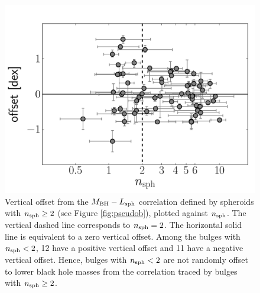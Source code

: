 \documentclass[preprint2]{emulateapj}
\begin{document}
\begin{figure}[h]
\begin{center}
\includegraphics[width=\columnwidth]{inset_psb.pdf}
\caption{Vertical offset from the $M_{\rm BH} - L_{\rm sph}$ correlation defined by spheroids with $n_{\rm sph} \geq 2$ (see Figure \ref{fig:pseudob}), 
plotted against $n_{\rm sph}$. 
The vertical dashed line corresponds to $n_{\rm sph} = 2$.
The horizontal solid line is equivalent to a zero vertical offset.
Among the bulges with $n_{\rm sph}<2$, 12 have a positive vertical offset and 11 have a negative vertical offset.
Hence, bulges with $n_{\rm sph}<2$ are not randomly offset to lower black hole masses 
from the correlation traced by bulges with $n_{\rm sph} \geq 2$.}
\label{fig:offset}
\end{center}
\end{figure}
\end{document}
